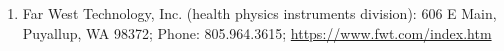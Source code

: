 \documentclass[12pt]{article}
\begin{document}
\begin{table}[!h]
\begin{tabular}{c|cccc}
    \end{tabular}
    \begin{enumerate}[label=\alph*]
        \item\label{addr:fwest}
        Far West Technology, Inc.
        (health physics instruments division):
        606 E Main,
        Puyallup, WA 98372;
        Phone: 805.964.3615;
        \url{https://www.fwt.com/index.htm}
    \end{enumerate}
\end{table}
\FloatBarrier
\end{document}
